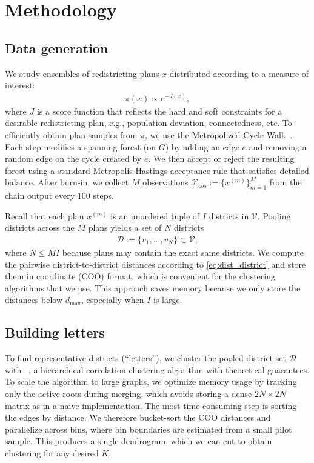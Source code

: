 \section{Methodology}\label{sec:chap4 methodology}

\subsection{Data generation}
We study ensembles of redistricting plans $x$ distributed according to a measure of interest:
    \begin{align}
        \pi(x)\propto e^{-J(x)},
    \end{align}
where $J$ is a score function that reflects the hard and soft constraints for a desirable redistricting plan, e.g., population deviation, connectedness, etc.
To efficiently obtain plan samples from $\pi$, we use the Metropolized Cycle Walk~\cite{cyclewalk}.
Each step modifies a spanning forest (on $G$) by adding an edge $e$ and removing a random edge on the cycle created by $e$.
We then accept or reject the resulting forest using a standard Metropolis-Hastings acceptance rule that satisfies detailed balance.
After burn-in, we collect $M$ observations $\mathcal{X}_{obs}:=\{x^{(m)}\}_{m=1}^M$ from the chain output every $100$ steps.

Recall that each plan $x^{(m)}$ is an unordered tuple of $I$ districts in $\mathcal{V}$. 
Pooling districts across the $M$ plans yields a set of $N$ districts
\begin{align}
    \mathcal{D} := \{v_1,\dots,v_N\}\subset \mathcal{V},
\end{align}
where $N\leq MI$ because plans may contain the exact same districts.
We compute the pairwise district-to-district distances according to \eqref{eq:dist_district} and store them in coordinate (COO) format, which is convenient for the clustering algorithms that we use.
This approach saves memory because we only store the distances below $d_{\max}$, especially when $I$ is large.

\subsection{Building letters}
To find representative districts (``letters''), we cluster the pooled district set $\mathcal{D}$ with \hccultra~\cite{DBLP:journals/corr/abs-2409-01010}, a hierarchical correlation clustering algorithm with theoretical guarantees.
To scale the algorithm to large graphs, we optimize memory usage by tracking only the active roots during merging, which avoids storing a dense $2N\times 2N$ matrix as in a naive implementation.
The most time-consuming step is sorting the edges by distance.
We therefore bucket-sort the COO distances and parallelize across bins, where bin boundaries are estimated from a small pilot sample.
This produces a single dendrogram, which we can cut to obtain clustering for any desired $K$.

